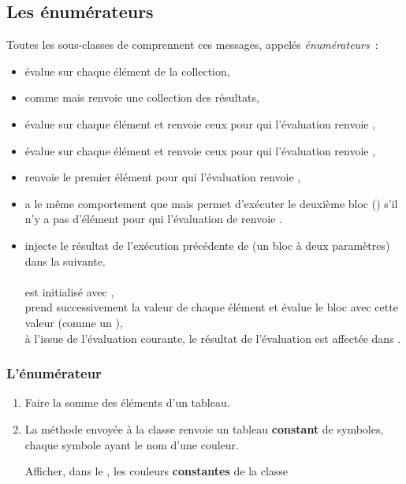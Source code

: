 \subsection{Les \'enum\'erateurs}
Toutes les sous-classes de  comprennent ces
messages, appel\'es {\it \'enum\'erateurs}~:
\begin{itemize}
\item
{} \'evalue  sur chaque \'el\'ement de la collection,
\item
{} comme  mais renvoie une collection des r\'esultats,
\item
{} \'evalue  sur chaque \'el\'ement et renvoie ceux pour qui l'\'evaluation renvoie ,
\item
{} \'evalue  sur chaque \'el\'ement et renvoie ceux pour qui l'\'evaluation renvoie ,
\item
{} renvoie le premier \'el\'ement pour qui l'\'evaluation renvoie ,
\item
{} a le m\^eme comportement que
 mais permet d'ex\'ecuter le deuxi\`eme bloc ()
s'il n'y a pas d'\'el\'ement  pour qui l'\'evaluation de 
renvoie .
\item
{} injecte le r\'esultat de l'ex\'ecution pr\'ec\'edente de  (un bloc \`a deux param\`etres)
dans la suivante.\\
\\
 est initialis\'e avec ,\\
 prend successivement la valeur de chaque \'el\'ement et \'evalue
le bloc avec cette valeur (comme un ),\\
\`a l'issue de l'\'evaluation courante, le r\'esultat de l'\'evaluation est
affect\'ee dans .
\end{itemize}

\subsubsection{L'\'enum\'erateur }

\begin{enumerate}
\item
Faire la somme des \'el\'ements d'un tableau.
\item
La m\'ethode  envoy\'ee \`a la classe 
renvoie un tableau {\bf constant} de symboles, chaque symbole ayant le nom
d'une couleur.

Afficher,  dans le , les couleurs {\bf constantes} de la
classe 
\end{enumerate}


